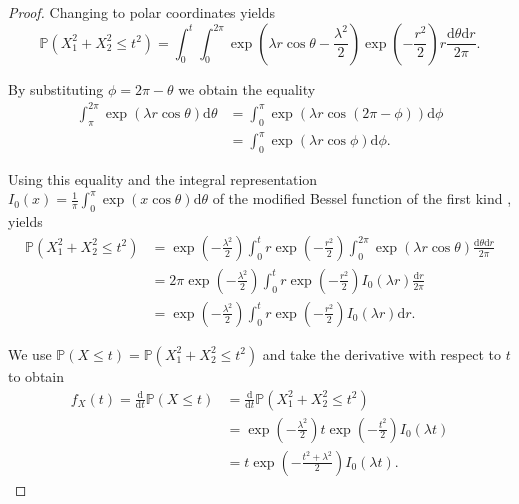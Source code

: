 \documentclass[a4paper,12pt]{article}
\theoremstyle{plain}
\theoremstyle{definition}
\numberwithin{equation}{section}
\begin{document}
\begin{appendix}
\begin{proof}
		Changing to polar coordinates yields
		\begin{equation*}
			\mathbb{P}\left( X_1^2 + X_2^2 \leq t^2 \right) = \int_0^t \int_0^{2 \pi} \exp \left( \lambda r \cos \theta - \frac{\lambda^2}{2} \right) \exp \left( - \frac{r^2}{2} \right) r \frac{\mathrm{d}\theta \mathrm{d}r}{2 \pi}.
		\end{equation*}
		
		By substituting $\phi = 2 \pi - \theta$ we obtain the equality
		\begin{align*}
			\int_\pi^{2 \pi} \exp \left( \lambda r \cos \theta \right) \mathrm{d}\theta &= \int_0^\pi \exp \left( \lambda r \cos \left( 2 \pi - \phi \right) \right) \mathrm{d}\phi \\
			&= \int_0^\pi \exp \left( \lambda r \cos \phi \right) \mathrm{d}\phi.
		\end{align*}
		
		Using this equality and the integral representation $I_0(x) = \frac{1}{\pi} \int_0^\pi \exp \left( x \cos \theta \right) \mathrm{d}\theta$ of the modified Bessel function of the first kind \cite[p.~181]{Watson}, yields
		\begin{align*}
			\mathbb{P}\left( X_1^2 + X_2^2 \leq t^2 \right) &= \exp \left( - \frac{\lambda^2}{2} \right) \int_0^t r \exp \left( - \frac{r^2}{2} \right) \int_0^{2 \pi} \exp \left( \lambda r \cos \theta \right) \frac{\mathrm{d}\theta \mathrm{d}r}{2 \pi} \\
			&= 2 \pi \exp \left( - \frac{\lambda^2}{2} \right) \int_0^t r \exp \left( - \frac{r^2}{2} \right) I_0 \left( \lambda r \right) \frac{\mathrm{d}r}{2 \pi} \\
			&= \exp \left( - \frac{\lambda^2}{2} \right) \int_0^t r \exp \left( - \frac{r^2}{2} \right) I_0 \left( \lambda r \right) \mathrm{d}r.
		\end{align*}
		
		We use $\mathbb{P}\left( X \leq t \right) = \mathbb{P}\left( X_1^2 + X_2^2 \leq t^2 \right)$ and take the derivative with respect to $t$ to obtain
		\begin{align*}
			f_X(t) = \frac{\mathrm{d}}{\mathrm{d}t} \mathbb{P}\left( X \leq t \right) &= \frac{\mathrm{d}}{\mathrm{d}t} \mathbb{P}\left( X_1^2 + X_2^2 \leq t^2 \right) \\
			&= \exp \left( - \frac{\lambda^2}{2} \right) t \exp \left( - \frac{t^2}{2} \right) I_0 \left( \lambda t \right) \\
			&= t \exp \left( - \frac{t^2 + \lambda^2}{2} \right) I_0 ( \lambda t ).
		\end{align*}
		

\end{proof}
\end{appendix}
\end{document}
